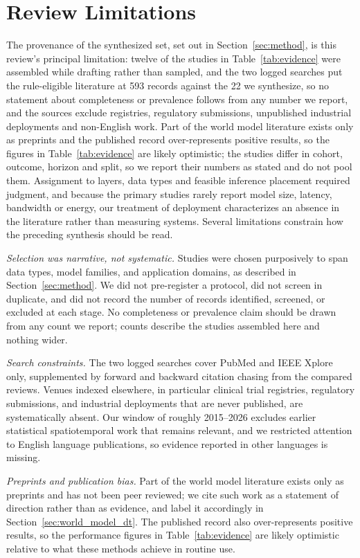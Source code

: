 \documentclass[journal]{IEEEtran}
\newif\ifsubmission
\begin{document}
\section{Review Limitations}
\label{sec:limitations}
\ifsubmission
The provenance of the synthesized set, set out in Section~\ref{sec:method}, is this review's principal limitation: twelve of the studies in Table~\ref{tab:evidence} were assembled while drafting rather than sampled, and the two logged searches put the rule-eligible literature at 593 records against the 22 we synthesize, so no statement about completeness or prevalence follows from any number we report, and the sources exclude registries, regulatory submissions, unpublished industrial deployments and non-English work. Part of the world model literature exists only as preprints and the published record over-represents positive results, so the figures in Table~\ref{tab:evidence} are likely optimistic; the studies differ in cohort, outcome, horizon and split, so we report their numbers as stated and do not pool them. Assignment to layers, data types and feasible inference placement required judgment, and because the primary studies rarely report model size, latency, bandwidth or energy, our treatment of deployment characterizes an absence in the literature rather than measuring systems.
\else
Several limitations constrain how the preceding synthesis should be read.

\emph{Selection was narrative, not systematic.} Studies were chosen purposively to span data types, model families, and application domains, as described in Section~\ref{sec:method}. We did not pre-register a protocol, did not screen in duplicate, and did not record the number of records identified, screened, or excluded at each stage. No completeness or prevalence claim should be drawn from any count we report; counts describe the studies assembled here and nothing wider.

\emph{Search constraints.} The two logged searches cover PubMed and IEEE Xplore only, supplemented by forward and backward citation chasing from the compared reviews. Venues indexed elsewhere, in particular clinical trial registries, regulatory submissions, and industrial deployments that are never published, are systematically absent. Our window of roughly 2015--2026 excludes earlier statistical spatiotemporal work that remains relevant, and we restricted attention to English language publications, so evidence reported in other languages is missing.

\emph{Preprints and publication bias.} Part of the world model literature exists only as preprints and has not been peer reviewed; we cite such work as a statement of direction rather than as evidence, and label it accordingly in Section~\ref{sec:world_model_dt}. The published record also over-represents positive results, so the performance figures in Table~\ref{tab:evidence} are likely optimistic relative to what these methods achieve in routine use.
\end{document}
